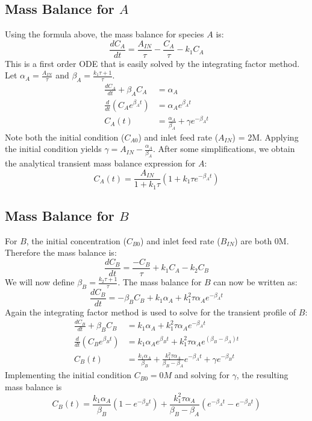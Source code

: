 \documentclass[a4paper,12pt]{article}
\begin{document}
\subsection{Mass Balance for $A$}
Using the formula above, the mass balance for species $A$ is: $$ \frac{dC_A}{dt} = \frac{A_{IN}}{\tau} - \frac{C_A}{\tau} -k_1 C_A$$
This is a first order ODE that is easily solved by the integrating factor method. 
Let $\alpha_A = \frac{A_{IN}}{\tau}$ and $\beta_A = \frac{k_1\tau + 1}{\tau} $.
\begin{align}
    \frac{dC_A}{dt} + \beta_A C_A &= \alpha_A \\
    \frac{d}{dt}(C_A e^{\beta_A t}) &= \alpha_A e^{\beta_A t} \\ 
    C_A(t) &= \frac{\alpha_A}{\beta_A} + \gamma e^{-\beta_A t}
\end{align}
Note both the initial condition ($C_{A0}$) and inlet feed rate ($A_{IN}$) = 2M. 
Applying the initial condition yields $\gamma = A_{IN} - \frac{\alpha_A}{\beta_A}$. 
After some simplifications, we obtain the analytical transient mass balance expression for $A$: 
\begin{equation}
    C_A(t) = \frac{A_{IN}}{1+ k_1\tau} (1+ k_1\tau e^{-\beta_A t})
\end{equation}

\subsection{Mass Balance for $B$}

For $B$, the initial concentration ($C_{B0}$) and inlet feed rate ($B_{IN}$) are both 0M. Therefore the mass balance is:
\begin{equation}
    \frac{dC_B}{dt} = \frac{-C_B}{\tau} + k_1C_A - k_2C_B
\end{equation}
We will now define $\beta_B = \frac{k_2\tau + 1}{\tau}$.
The mass balance for $B$ can now be written as:
\begin{equation}
    \frac{dC_B}{dt} = -\beta_B C_B + k_1\alpha_A + k_1^2 \tau \alpha_A e^{-\beta_A t}
\end{equation}
Again the integrating factor method is used to solve for the transient profile of $B$: 
\begin{align}
    \frac{dC_B}{dt} + \beta_B C_B &=  k_1\alpha_A + k_1^2 \tau \alpha_A e^{-\beta_A t}\\
    \frac{d}{dt}(C_B e^{\beta_B t}) &= k_1\alpha_A e^{\beta_B t} + k_1^2 \tau \alpha_A e^{(\beta_B-\beta_A) t}\\
    C_B(t) &= \frac{k_1\alpha_A}{\beta_B} + \frac{k_1^2 \tau \alpha_A}{\beta_B - \beta_A} e^{-\beta_A t} + \gamma e^{-\beta_B t} 
\end{align}
Implementing the initial condition $C_{B0} = 0M$ and solving for $\gamma$, the resulting mass balance is 
\begin{equation}
    C_B(t) = \frac{k_1 \alpha_A}{\beta_B}(1-e^{-\beta_B t}) + \frac{k_1^2 \tau \alpha_A}{\beta_B - \beta_A} (e^{-\beta_A t} - e^{-\beta_B t})
\end{equation}
\end{document}
